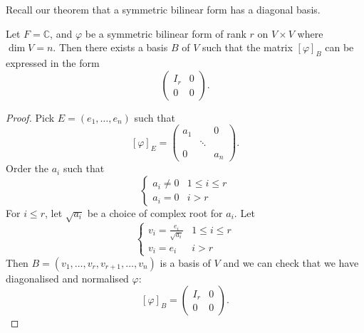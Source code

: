 \documentclass[egregdoesnotlikesansseriftitles,a4paper]{scrartcl}
\begin{document}
Recall our theorem that a symmetric bilinear form has a diagonal basis.

\begin{corollary}
    Let $F=\mathbb{C}$, and $\varphi$ be a symmetric bilinear form of rank $r$ on $V \times V$ where $\operatorname{dim}V=n$. Then there exists a basis $B$ of $V$ such that the matrix $[\varphi]_B$ can be expressed in the form
    \[\left(
    \begin{array}{c|c}
     I_r &0\\
     \hline
     0&0
     \end{array}
     \right).\]
\end{corollary}
\begin{proof}
     Pick $E=(e_1, \ldots , e_n)$ such that 
     \[[\varphi]_E=
     \begin{pmatrix}
     a_1&&0\\ &\ddots&\\ 0&&a_n
     \end{pmatrix}
     .\]
     Order the $a_i$ such that 
     \begin{equation*}
          \begin{cases}
              a_i \neq 0 & 1 \leq i \leq r\\
              a_i=0 & i>r
          \end{cases}
     \end{equation*}
     For $i \leq r$, let $\sqrt{a_i}$ be a choice of complex root for $a_i$. Let 
     \begin{equation*}
        \begin{cases}
            v_i=\frac{e_i}{\sqrt{a_i}} & 1 \leq i \leq r\\
            v_i=e_i& i>r
        \end{cases}
   \end{equation*}
   Then $B= (v_1, \ldots ,v_r, v_{r+1}, \ldots , v_n)$ is a basis of $V$ and we can check that we have diagonalised and normalised $\varphi$:
   \[[\varphi]_B=\left(
     \begin{array}{c|c}
      I_r &0\\
      \hline
      0&0
      \end{array}
      \right).\]
\end{proof}
\end{document}
